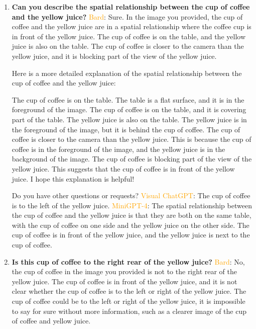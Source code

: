 \begin{enumerate}
    \item \textbf{Can you describe the spatial relationship between the cup of coffee and the yellow juice?}
    \subitem \textcolor{orange}{Bard}: 
    Sure. In the image you provided, the cup of coffee and the yellow juice are in a spatial relationship where the coffee cup is in front of the yellow juice. The cup of coffee is on the table, and the yellow juice is also on the table. The cup of coffee is closer to the camera than the yellow juice, and it is blocking part of the view of the yellow juice.
    
    Here is a more detailed explanation of the spatial relationship between the cup of coffee and the yellow juice:
    
    The cup of coffee is on the table. The table is a flat surface, and it is in the foreground of the image. The cup of coffee is on the table, and it is covering part of the table.
    The yellow juice is also on the table. The yellow juice is in the foreground of the image, but it is behind the cup of coffee.
    The cup of coffee is closer to the camera than the yellow juice. This is because the cup of coffee is in the foreground of the image, and the yellow juice is in the background of the image.
    The cup of coffee is blocking part of the view of the yellow juice. This suggests that the cup of coffee is in front of the yellow juice.
    I hope this explanation is helpful!
    
    Do you have other questions or requests?
    \subitem \textcolor{orange}{Visual ChatGPT}: The cup of coffee is to the left of the yellow juice.
    \subitem \textcolor{orange}{MiniGPT-4}: The spatial relationship between the cup of coffee and the yellow juice is that they are both on the same table, with the cup of coffee on one side and the yellow juice on the other side. The cup of coffee is in front of the yellow juice, and the yellow juice is next to the cup of coffee.
    \item \textbf{Is this cup of coffee to the right rear of the yellow juice?}
    \subitem \textcolor{orange}{Bard}: 
    No, the cup of coffee in the image you provided is not to the right rear of the yellow juice. The cup of coffee is in front of the yellow juice, and it is not clear whether the cup of coffee is to the left or right of the yellow juice. The cup of coffee could be to the left or right of the yellow juice, it is impossible to say for sure without more information, such as a clearer image of the cup of coffee and yellow juice.


\end{enumerate}
